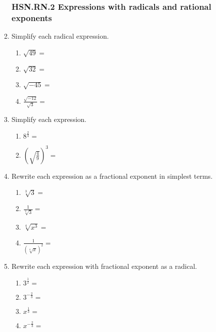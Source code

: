 \documentclass[12pt, twoside]{article}
\begin{document}
\begin{enumerate}[itemsep=0.5cm]
\newpage

\subsubsection*{HSN.RN.2 Expressions with radicals and rational exponents}
\item Simplify each radical expression.
    \begin{multicols}{2}
    \begin{enumerate}[itemsep=0.5cm]
        \item $\sqrt{49}=$
        \item $\sqrt{32}=$
        \item $\sqrt{-45}=$
        \item $\displaystyle \frac{\sqrt{-12}}{\sqrt{3}}=$
    \end{enumerate}
    \end{multicols} \vspace{1cm}
    
\item Simplify each expression.
    \begin{multicols}{2}
    \begin{enumerate}[itemsep=0.5cm]
        \item $\displaystyle 8^{\frac{2}{3}} =$
        \item $\left( \sqrt{\frac{4}{9}} \right)^{3} =$
    \end{enumerate}
    \end{multicols} \vspace{2cm}

    
\item Rewrite each expression as a fractional exponent in simplest terms.
    \begin{multicols}{2}
      \begin{enumerate}[itemsep=1cm]
          \item $\sqrt[3]{3} =$
          \item $\displaystyle \frac{1}{\sqrt[2]{3}}=$
          \item $\sqrt[4]{x^3} =$
          \item $\displaystyle \frac{1}{(\sqrt[4]{x})^2}=$
      \end{enumerate}
      \end{multicols} \vspace{1cm}
  
\item Rewrite each expression with fractional exponent as a radical.
    \begin{multicols}{2}
      \begin{enumerate}[itemsep=1cm]
        \item $\displaystyle 3^{\frac{1}{2}}=$
        \item $\displaystyle 3^{-\frac{2}{3}}=$
        \item $\displaystyle x^{\frac{1}{3}}=$
        \item $\displaystyle x^{-\frac{2}{3}}=$
      \end{enumerate}
      \end{multicols}


\end{enumerate}
\end{document}
